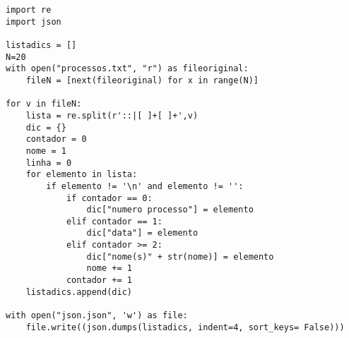 \documentclass[11pt,a4paper]{report}%
\begin{document}
\begin{lstlisting}
import re 
import json 

listadics = []
N=20
with open("processos.txt", "r") as fileoriginal:
    fileN = [next(fileoriginal) for x in range(N)]

for v in fileN: 
    lista = re.split(r'::|[ ]+[ ]+',v)
    dic = {}
    contador = 0 
    nome = 1 
    linha = 0 
    for elemento in lista: 
        if elemento != '\n' and elemento != '': 
            if contador == 0: 
                dic["numero processo"] = elemento
            elif contador == 1: 
                dic["data"] = elemento
            elif contador >= 2: 
                dic["nome(s)" + str(nome)] = elemento
                nome += 1
            contador += 1
    listadics.append(dic)
    
with open("json.json", 'w') as file:
    file.write((json.dumps(listadics, indent=4, sort_keys= False)))
\end{lstlisting}




\end{document}
